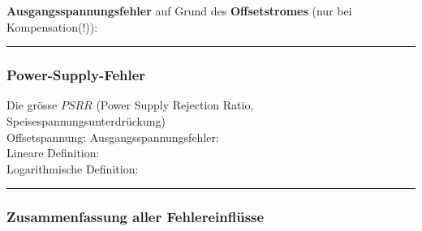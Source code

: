 			\begin{minipage}{18cm}
            	\vspace{3mm}
				\textbf{Ausgangsspannungsfehler} auf Grund des \textbf{Offsetstromes} (nur bei
				Kompensation(!)):
				\\
			\end{minipage}
\hrule

		\subsubsection{Power-Supply-Fehler }
			\begin{minipage}{18cm}
            Die grösse $PSRR$ (Power Supply Rejection Ratio, Speisespannungsunterdrückung)\\
            Offsetspannung: 
            \hspace{10mm}
            Ausgangsspannungsfehler:
            \\
            Lineare Definition: \hspace{11mm}
            \\
            Logarithmische Definition:
            \\
            \end{minipage}

\hrule

		\subsubsection{Zusammenfassung aller Fehlereinflüsse }
			\begin{minipage}{18cm}
            	\\
            \end{minipage}

\newpage

